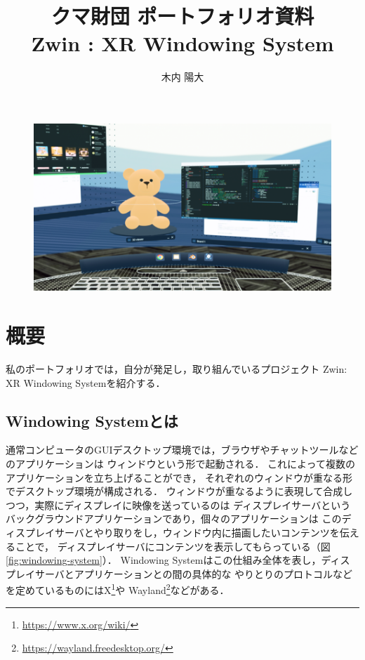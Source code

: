\documentclass[a4paper]{jsarticle}
\title{\vspace{-2cm}
  クマ財団 ポートフォリオ資料 \\
  Zwin : XR Windowing System
}
\author{
  木内 陽大
}
\begin{document}
\maketitle

\begin{figure}[htbp]
  \centering
  \includegraphics[width=\linewidth]{figure/hero2.png}
\end{figure}

\section{概要}

私のポートフォリオでは，自分が発足し，取り組んでいるプロジェクト
Zwin: XR Windowing Systemを紹介する．

\subsection{Windowing Systemとは}

通常コンピュータのGUIデスクトップ環境では，ブラウザやチャットツールなどのアプリケーションは
ウィンドウという形で起動される．
これによって複数のアプリケーションを立ち上げることができ，
それぞれのウィンドウが重なる形でデスクトップ環境が構成される．
ウィンドウが重なるように表現して合成しつつ，実際にディスプレイに映像を送っているのは
ディスプレイサーバというバックグラウンドアプリケーションであり，個々のアプリケーションは
このディスプレイサーバとやり取りをし，ウィンドウ内に描画したいコンテンツを伝えることで，
ディスプレイサーバにコンテンツを表示してもらっている（図\ref{fig:windowing-system}）．
Windowing Systemはこの仕組み全体を表し，ディスプレイサーバとアプリケーションとの間の具体的な
やりとりのプロトコルなどを定めているものにはX\footnote{\url{https://www.x.org/wiki/}}や
Wayland\footnote{\url{https://wayland.freedesktop.org/}}などがある．
\end{document}
